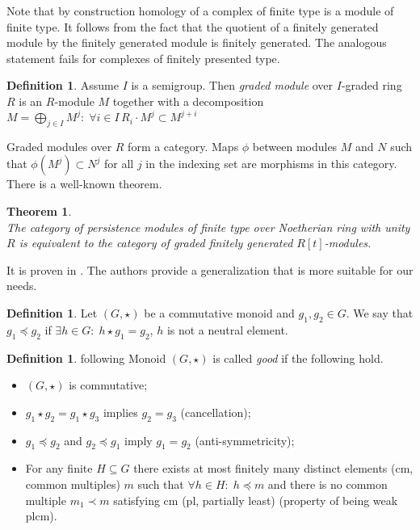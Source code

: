 \documentclass[english,12pt]{article}
\newcounter{stmcounter}[section]
\newcounter{thcounter}
\numberwithin{equation}{section}
\newtheorem{theorem}[thcounter]{Theorem}
\theoremstyle{definition}
\newtheorem{definition}[stmcounter]{Definition}
\theoremstyle{remark}
\newcommand{\define}[1]{{\textit{#1}}}
\begin{document}
Note that by construction homology of a complex of finite type is a module of finite type. It follows from the fact that the quotient of a finitely generated module by the finitely generated module is finitely generated. The analogous statement fails for complexes of finitely presented type.\\

\begin{definition}
  Assume $I$ is a semigroup. Then \define{graded module} over $I$-graded ring $R$ is an $R$-module $M$ together with a decomposition $M = \bigoplus_{j \in I} M^j:\; \forall i \in I\, R_i \cdot M^j \subset M^{j+i}$
\end{definition}

Graded modules over $R$ form a category. Maps $\phi$ between modules $M$ and $N$ such that $\phi(M^j) \subset N^j$ for all $j$ in the indexing set are morphisms in this category.\\

There is a well-known theorem.

\begin{theorem} {\cite[Theorem 3.1]{Zomorodian05}}\\
  The category of persistence modules of finite type over Noetherian ring with unity $R$ is equivalent to the category of graded finitely generated $R[t]$-modules.
\end{theorem}

It is proven in {\cite{Corbet18}}. The authors provide a generalization that is more suitable for our needs.\\

\begin{definition}
  Let $(G,\star)$ be a commutative monoid and $g_1, g_2 \in G$.
  We say that $g_1 \preceq g_2$ if $\exists h \in G:\; h \star g_1 = g_2$, $h$ is not a neutral element.
\end{definition}

\begin{definition} {following \cite[Definition 11]{Corbet18}}
  Monoid $(G,\star)$ is called \define{good} if the following hold.
  \begin{itemize}
    \item $(G, \star)$ is commutative;
    \item $g_1 \star g_2 = g_1 \star g_3$ implies $g_2 = g_3$ (cancellation);
    \item $g_1 \preceq g_2$ and $g_2 \preceq g_1$ imply $g_1 = g_2$ (anti-symmetricity);
    \item For any finite $H \subseteq G$ there exists at most finitely many distinct elements (cm, common multiples) $m$ such that $\forall h \in H:\; h \preceq m$ and there is no common multiple $m_1 \prec m$ satisfying cm (pl, partially least) (property of being weak plcm).
  \end{itemize}
\end{definition}
\end{document}

